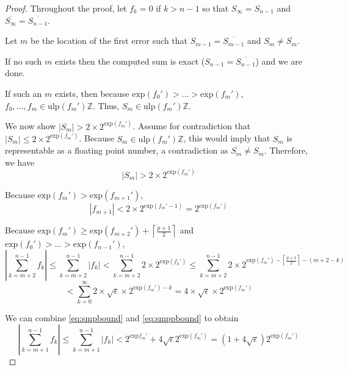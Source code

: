 \documentclass[12pt]{article}
\providecommand{\ceil}[1]{\left \lceil #1 \right \rceil }
\providecommand{\Z}{\ensuremath{\mathbb{Z}}}
\providecommand{\exp}{\ensuremath{\text{exp}}}
\providecommand{\ulp}{\ensuremath{\text{ulp}}}
\theoremstyle{definition}
\numberwithin{equation}{section}
\numberwithin{figure}{section}
\begin{document}
    \begin{proof}

      Throughout the proof, let $f_k = 0$ if $k > n - 1$ so that $S_{\infty} = S_{n - 1}$ and $\overline{S_{\infty}} = \overline{S_{n - 1}}$.

      Let $m$ be the location of the first error such that $S_{m - 1} = \overline{S_{m - 1}}$ and $S_{m} \neq \overline{S_{m}}$.

      If no such $m$ exists then the computed sum is exact ($S_{n - 1} = \overline{S_{n - 1}}$) and we are done.

      If such an $m$ exists, then because $\exp(f_0') > ... > \exp(f_m')$, $f_0, ..., f_m \in \ulp(f_m')\Z$. Thus, $S_m \in \ulp(f_m')\Z$.

      We now show $|S_m| > 2 \times 2^{\exp(f_m')}$. Assume for contradiction that $|S_m| \leq 2 \times 2^{\exp(f_m')}$. Because $S_m \in \ulp(f_m')\Z$, this would imply that $S_m$ is representable as a floating point number, a contradiction as $\overline{S_m} \neq S_m$. Therefore, we have
      \begin{equation}
        |S_m| > 2 \times 2^{\exp(f_m')}
        \label{eq:smbound}
      \end{equation}

      Because $\exp(f_m') > \exp(f_{m + 1}')$,
      \begin{equation}
        |f_{m + 1}| < 2\times2^{\exp(f_m' - 1)} = 2^{\exp(f_m')}
        \label{eq:smpbound}
      \end{equation}

      Because $\exp(f_m') \geq \exp(f_{m + 2}') + \ceil{\frac{p + 1}{2}}$ and $\exp(f_0') > ... > \exp(f_{n - 1}')$,
      \begin{equation*}
        |\sum \limits_{k = m + 2}^{n - 1} f_k| \leq \sum \limits_{k = m + 2}^{n - 1} |f_k| < \sum \limits_{k = m + 2}^{n - 1} 2 \times 2^{\exp(f_k')} \leq \sum \limits_{k = m + 2}^{n - 1} 2 \times 2^{\exp(f_m') - \ceil{\frac{p + 1}{2}} - (m + 2 - k)}
      \end{equation*}
      \begin{equation}
        < \sum \limits_{k = 0}^{\infty} 2 \times \sqrt{\epsilon} \times 2^{\exp(f_m') - k} = 4 \times \sqrt\epsilon \times 2^{\exp(f_m')}
        \label{eq:smppbound}
      \end{equation}

      We can combine  \eqref{eq:smpbound} and \eqref{eq:smppbound} to obtain
      \begin{equation}
        |\sum\limits_{k = m + 1}^{n - 1} f_k| \leq \sum\limits_{k = m + 1}^{n - 1} |f_k| < 2^{\exp{f_m'}} + 4 \sqrt{\epsilon} 2^{\exp(f_m')} = (1 + 4 \sqrt\epsilon )2^{\exp(f_m')}
        \label{eq:smsbound}
      \end{equation}


\end{proof}
\end{document}
